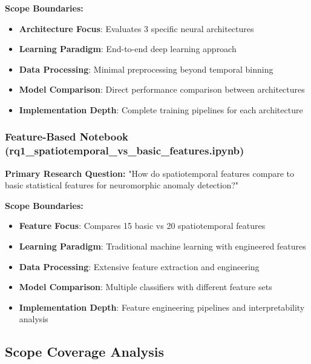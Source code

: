 \documentclass[11pt,a4paper]{article}
\begin{document}
\textbf{Scope Boundaries:}
\begin{itemize}
    \item \textbf{Architecture Focus}: Evaluates 3 specific neural architectures
    \item \textbf{Learning Paradigm}: End-to-end deep learning approach
    \item \textbf{Data Processing}: Minimal preprocessing beyond temporal binning
    \item \textbf{Model Comparison}: Direct performance comparison between architectures
    \item \textbf{Implementation Depth}: Complete training pipelines for each architecture
\end{itemize}

\subsubsection{Feature-Based Notebook (rq1\_spatiotemporal\_vs\_basic\_features.ipynb)}
\textbf{Primary Research Question:} "How do spatiotemporal features compare to basic statistical features for neuromorphic anomaly detection?"

\textbf{Scope Boundaries:}
\begin{itemize}
    \item \textbf{Feature Focus}: Compares 15 basic vs 20 spatiotemporal features
    \item \textbf{Learning Paradigm}: Traditional machine learning with engineered features
    \item \textbf{Data Processing}: Extensive feature extraction and engineering
    \item \textbf{Model Comparison}: Multiple classifiers with different feature sets
    \item \textbf{Implementation Depth}: Feature engineering pipelines and interpretability analysis
\end{itemize}

\subsection{Scope Coverage Analysis}
\end{document}
